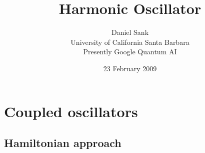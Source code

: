 \documentclass{article}
\title{Harmonic Oscillator}
\author{Daniel Sank \\ \small{University of California Santa Barbara} \\ \small{Presently Google Quantum AI}}
\date{23 February 2009}
\begin{document}
\maketitle



\section{Coupled oscillators}



\subsection{Hamiltonian approach}


\end{document}
